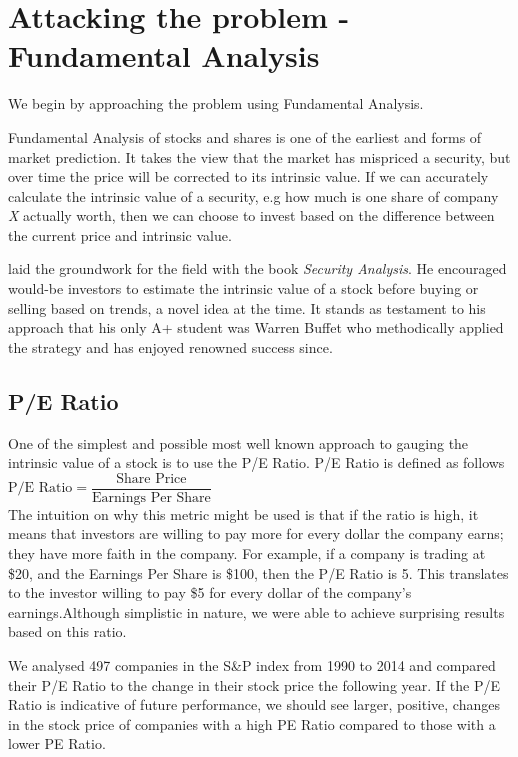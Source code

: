 \documentclass{report}
\begin{document}
\section{Attacking the problem - Fundamental Analysis}

We begin by approaching the problem using Fundamental Analysis. 

Fundamental Analysis of stocks and shares is one of the earliest and forms of market prediction. It takes the view that the market has mispriced a security, but over time the price will be corrected to its intrinsic value. If we can accurately calculate the intrinsic value of a security, e.g how much is one share of company \textit{X} actually worth, then we can choose to invest based on the difference between the current price and intrinsic value. 

\citet{graham1934security} laid the groundwork for the field with the book \textit{Security Analysis}. He encouraged would-be investors to estimate the intrinsic value of a stock before buying or selling based on trends, a novel idea at the time. It stands as testament to his approach that his only A+ student was Warren Buffet who methodically applied the strategy and has enjoyed renowned success since. \cite{schroeder2008snowball}

\subsection{P/E Ratio}

One of the simplest and possible most well known approach to gauging the intrinsic value of a stock is to use the P/E Ratio. P/E Ratio is defined as follows\\

\begin{math}
	\text{P/E Ratio} = \dfrac{\text{Share Price}}{\text{Earnings Per Share}}
\end{math}\\

The intuition on why this metric might be used is that if the ratio is high, it means that investors are willing to pay more for every dollar the company earns; they have more faith in the company. For example, if a company is trading at \$20, and the Earnings Per Share is \$100, then the P/E Ratio is 5. This translates to the investor willing to pay \$5 for every dollar of the company's earnings.Although simplistic in nature, we were able to achieve surprising results based on this ratio. 

We analysed 497 companies in the S{\&}P index from 1990 to 2014 and compared their P/E Ratio to the change in their stock price the following year. If the P/E Ratio is indicative of future performance, we should see larger, positive, changes in the stock price of companies with a high PE Ratio compared to those with a lower PE Ratio.
\end{document}
